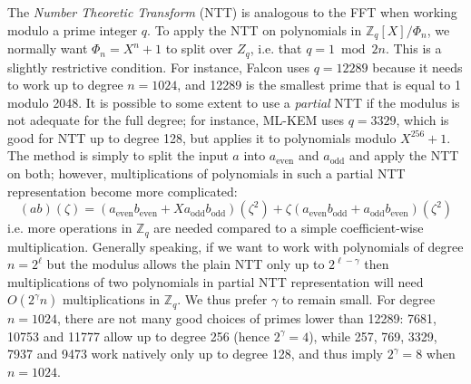 \documentclass{llncs}
\newcommand{\bZ}{\mathbb{Z}}
\begin{document}
The \emph{Number Theoretic Transform} (NTT) is analogous to the FFT when
working modulo a prime integer $q$. To apply the NTT on polynomials in
$\bZ_q[X]/\Phi_n$, we normally want $\Phi_n = X^n + 1$ to split over
$Z_q$, i.e. that $q = 1 \bmod 2n$. This is a slightly restrictive
condition. For instance, Falcon uses $q = 12289$ because it needs to
work up to degree $n = 1024$, and 12289 is the smallest prime that is
equal to 1 modulo 2048. It is possible to some extent to use a
\emph{partial} NTT if the modulus is not adequate for the full degree;
for instance, ML-KEM\cite{Fips203} uses $q = 3329$, which is good for NTT
up to degree 128, but applies it to polynomials modulo $X^{256} + 1$.
The method is simply to split the input $a$ into $a_{\text{even}}$ and
$a_{\text{odd}}$ and apply the NTT on both; however, multiplications of
polynomials in such a partial NTT representation become more
complicated:
\begin{equation*}
    (ab)(\zeta) =
        (a_{\text{even}} b_{\text{even}}
            + X a_{\text{odd}} b_{\text{odd}})(\zeta^2)
        + \zeta (a_{\text{even}} b_{\text{odd}}
            + a_{\text{odd}} b_{\text{even}})(\zeta^2)
\end{equation*}
i.e. more operations in $\bZ_q$ are needed compared to a simple
coefficient-wise multiplication. Generally speaking, if we want to work
with polynomials of degree $n = 2^\ell$ but the modulus allows the plain
NTT only up to $2^{\ell - \gamma}$ then multiplications of two
polynomials in partial NTT representation will need $O(2^\gamma n)$
multiplications in $\bZ_q$. We thus prefer $\gamma$ to remain small. For
degree $n = 1024$, there are not many good choices of primes lower than
12289: 7681, 10753 and 11777 allow up to degree 256 (hence $2^\gamma =
4$), while 257, 769, 3329, 7937 and 9473 work natively only up to degree
128, and thus imply $2^\gamma = 8$ when $n = 1024$.
\end{document}
